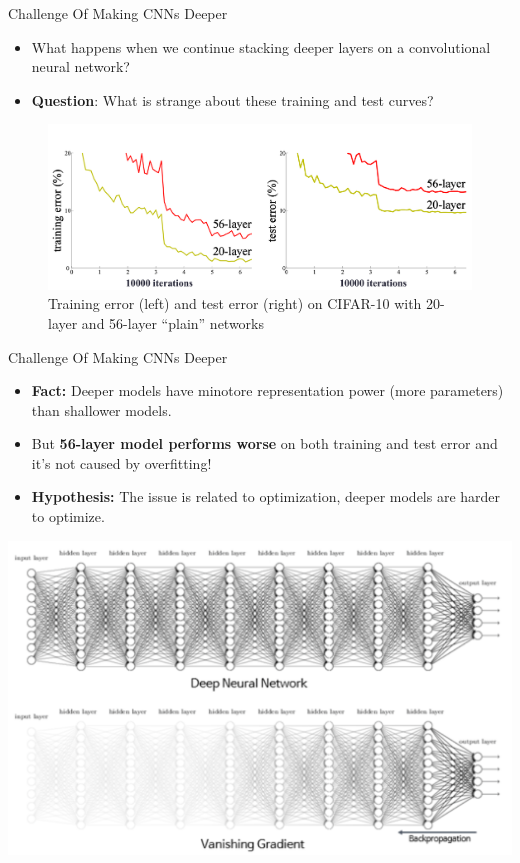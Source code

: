 \documentclass[serif, aspectratio=169]{beamer}
\begin{document}
\begin{frame}{Challenge Of Making CNNs Deeper}
	\begin{itemize}
		\item What happens when we continue stacking deeper layers on a convolutional neural network?
		\item \textbf{Question}: What is strange about these training and test curves?
	\end{itemize}
	\begin{figure}[htpb]
		\begin{center}
			\includegraphics[keepaspectratio, scale=0.17]{pic/plain}
			\captionsetup{justification=centering}
			\caption*{\scriptsize{Training error (left) and test error (right) on CIFAR-10 with 20-layer and 56-layer “plain” networks}}
		\end{center}
	\end{figure}
\end{frame}

\begin{frame}{Challenge Of Making CNNs Deeper}
	\begin{itemize}
		\item \textbf{Fact:} Deeper models have minotore representation power (more parameters) than shallower models.
		\item But \textbf{56-layer model performs worse} on both training and test error and it's not caused by overfitting!
		\item \textbf{Hypothesis:} The issue is related to optimization, deeper models are harder to optimize.	
	\end{itemize}
	\vspace{-0.5cm}
	\centering
	\includegraphics[keepaspectratio, scale=0.23]{pic/vanish}
\end{frame}
\end{document}
